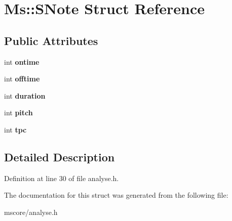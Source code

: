\hypertarget{struct_ms_1_1_s_note}{}\section{Ms\+:\+:S\+Note Struct Reference}
\label{struct_ms_1_1_s_note}
\subsection*{Public Attributes}
\begin{DoxyCompactItemize}
\item 
\mbox{\label{struct_ms_1_1_s_note_a8f6b0839ad1e6bc8cd2939a75de0c145}} 
int {\bfseries ontime}
\item 
\mbox{\label{struct_ms_1_1_s_note_a100fc7d9957b131ba4410cc402d99136}} 
int {\bfseries offtime}
\item 
\mbox{\label{struct_ms_1_1_s_note_a0d9bada5ea6d0093bea95cc331485fc7}} 
int {\bfseries duration}
\item 
\mbox{\label{struct_ms_1_1_s_note_ac8c57ba3dbb02951a12d64d5bf0c0c53}} 
int {\bfseries pitch}
\item 
\mbox{\label{struct_ms_1_1_s_note_a17662628129db7ddecc0dd918691e4d1}} 
int {\bfseries tpc}
\end{DoxyCompactItemize}


\subsection{Detailed Description}


Definition at line 30 of file analyse.\+h.



The documentation for this struct was generated from the following file\+:\begin{DoxyCompactItemize}
\item 
mscore/analyse.\+h\end{DoxyCompactItemize}
